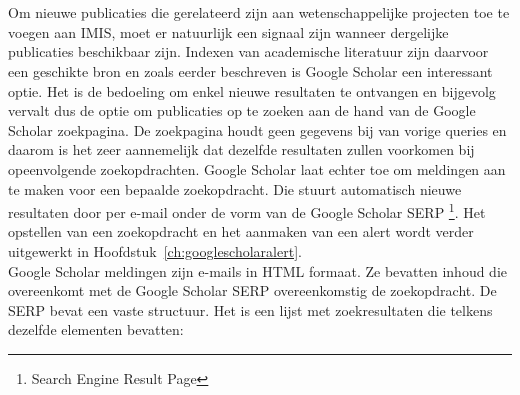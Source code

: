 
\chapter{}%
\label{ch:methodologie}

Om nieuwe publicaties die gerelateerd zijn aan wetenschappelijke projecten toe te voegen aan IMIS, moet er natuurlijk een signaal zijn wanneer dergelijke publicaties beschikbaar zijn. Indexen van academische literatuur zijn daarvoor een geschikte bron en zoals eerder beschreven is Google Scholar een interessant optie. Het is de bedoeling om enkel nieuwe resultaten te ontvangen en bijgevolg vervalt dus de optie om publicaties op te zoeken aan de hand van de Google Scholar zoekpagina. De zoekpagina houdt geen gegevens bij van vorige queries en daarom is het zeer aannemelijk dat dezelfde resultaten zullen voorkomen bij opeenvolgende zoekopdrachten. Google Scholar laat echter toe om meldingen aan te maken voor een bepaalde zoekopdracht. Die stuurt automatisch nieuwe resultaten door per e-mail onder de vorm van de Google Scholar SERP \footnote{Search Engine Result Page}. Het opstellen van een zoekopdracht en het aanmaken van een alert wordt verder uitgewerkt in Hoofdstuk~\ref{ch:googlescholaralert}.\\
Google Scholar meldingen zijn e-mails in HTML formaat. Ze bevatten inhoud die overeenkomt met de Google Scholar SERP overeenkomstig de zoekopdracht. De SERP bevat een vaste structuur. Het is een lijst met zoekresultaten die telkens dezelfde elementen bevatten:
